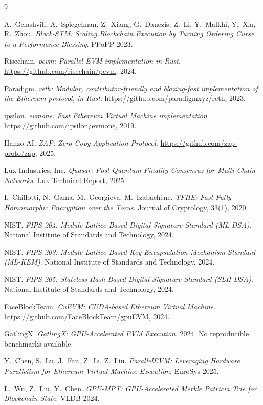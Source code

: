 \begin{thebibliography}{9}

A.~Gelashvili, A.~Spiegelman, Z.~Xiang, G.~Danezis, Z.~Li, Y.~Malkhi, Y.~Xia, R.~Zhou.
\emph{Block-STM: Scaling Blockchain Execution by Turning Ordering Curse to a Performance Blessing}.
PPoPP 2023.

Risechain.
\emph{pevm: Parallel EVM implementation in Rust}.
\url{https://github.com/risechain/pevm}, 2024.

Paradigm.
\emph{reth: Modular, contributor-friendly and blazing-fast implementation of the Ethereum protocol, in Rust}.
\url{https://github.com/paradigmxyz/reth}, 2023.

ipsilon.
\emph{evmone: Fast Ethereum Virtual Machine implementation}.
\url{https://github.com/ipsilon/evmone}, 2019.

Hanzo AI.
\emph{ZAP: Zero-Copy Application Protocol}.
\url{https://github.com/zap-proto/zap}, 2025.

Lux Industries, Inc.
\emph{Quasar: Post-Quantum Finality Consensus for Multi-Chain Networks}.
Lux Technical Report, 2025.

I.~Chillotti, N.~Gama, M.~Georgieva, M.~Izabach\`{e}ne.
\emph{TFHE: Fast Fully Homomorphic Encryption over the Torus}.
Journal of Cryptology, 33(1), 2020.

NIST.
\emph{FIPS 204: Module-Lattice-Based Digital Signature Standard (ML-DSA)}.
National Institute of Standards and Technology, 2024.

NIST.
\emph{FIPS 203: Module-Lattice-Based Key-Encapsulation Mechanism Standard (ML-KEM)}.
National Institute of Standards and Technology, 2024.

NIST.
\emph{FIPS 205: Stateless Hash-Based Digital Signature Standard (SLH-DSA)}.
National Institute of Standards and Technology, 2024.

FaceBlockTeam.
\emph{CuEVM: CUDA-based Ethereum Virtual Machine}.
\url{https://github.com/FaceBlockTeam/gpuEVM}, 2024.

GatlingX.
\emph{GatlingX: GPU-Accelerated EVM Execution}.
2024. No reproducible benchmarks available.

Y.~Chen, S.~Lu, J.~Fan, Z.~Li, Z.~Liu.
\emph{ParallelEVM: Leveraging Hardware Parallelism for Ethereum Virtual Machine Execution}.
EuroSys 2025.

L.~Wu, Z.~Liu, Y.~Chen.
\emph{GPU-MPT: GPU-Accelerated Merkle Patricia Trie for Blockchain State}.
VLDB 2024.

\end{thebibliography}

